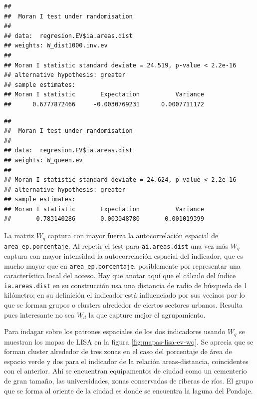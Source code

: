\documentclass[12pt,]{book}
\newenvironment{Shaded}{\begin{snugshade}}{\end{snugshade}}
\newcommand{\KeywordTok}[1]{\textcolor[rgb]{0.13,0.29,0.53}{\textbf{#1}}}
\newcommand{\DataTypeTok}[1]{\textcolor[rgb]{0.13,0.29,0.53}{#1}}
\newcommand{\OperatorTok}[1]{\textcolor[rgb]{0.81,0.36,0.00}{\textbf{#1}}}
\newcommand{\NormalTok}[1]{#1}
\begin{document}
\begin{verbatim}
## 
##  Moran I test under randomisation
## 
## data:  regresion.EV$ia.areas.dist  
## weights: W_dist1000.inv.ev  
## 
## Moran I statistic standard deviate = 24.519, p-value < 2.2e-16
## alternative hypothesis: greater
## sample estimates:
## Moran I statistic       Expectation          Variance 
##      0.6777872466     -0.0030769231      0.0007711172
\end{verbatim}

\begin{Shaded}
\end{Shaded}

\begin{verbatim}
## 
##  Moran I test under randomisation
## 
## data:  regresion.EV$ia.areas.dist  
## weights: W_queen.ev  
## 
## Moran I statistic standard deviate = 24.624, p-value < 2.2e-16
## alternative hypothesis: greater
## sample estimates:
## Moran I statistic       Expectation          Variance 
##       0.783140286      -0.003048780       0.001019399
\end{verbatim}

La matriz \(W_q\) captura con mayor fuerza la autocorrelación espacial
de \texttt{area\_ep.porcentaje}. Al repetir el test para
\texttt{ai.areas.dist} una vez más \(W_q\) captura con mayor intensidad
la autocorrelación espacial del indicador, que es mucho mayor que en
\texttt{area\_ep.porcentaje}, posiblemente por representar una
característica local del acceso. Hay que anotar aquí que el cálculo del
índice \texttt{ia.areas.dist} en su construcción usa una distancia de
radio de búsqueda de 1 kilómetro; en su definición el indicador está
influenciado por sus vecinos por lo que se forman grupos o clusters
alrededor de ciertos sectores urbanos. Resulta pues interesante no sea
\(W_d\) la que capture mejor el agrupamiento.

Para indagar sobre los patrones espaciales de los dos indicadores usando
\(W_q\) se muestran los mapas de LISA en la figura
\ref{fig:mapas-lisa-ev-wq}. Se aprecia que se forman cluster alrededor
de tres zonas en el caso del porcentaje de área de espacio verde y dos
para el indicador de la relación areas-distancia, coincidentes con el
anterior. Ahí se encuentran equipamentos de ciudad como un cementerio de
gran tamaño, las universidades, zonas conservadas de riberas de ríos. El
grupo que se forma al oriente de la ciudad es donde se encuentra la
laguna del Pondaje.
\end{document}
